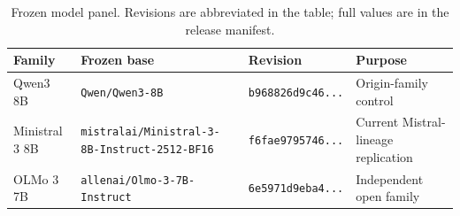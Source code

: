 \begin{table}[t]
\centering
\caption{Frozen model panel. Revisions are abbreviated in the table; full values are in the release manifest.}
\label{tab:model-panel}
\footnotesize
\begin{tabularx}{\textwidth}{@{}p{}p{}p{}X@{}}
\toprule
\textbf{Family} & \textbf{Frozen base} & \textbf{Revision} & \textbf{Purpose} \\
\midrule
Qwen3 8B & \texttt{Qwen/Qwen3-8B} & \texttt{b968826d9c46...} & Origin-family control \\
Ministral 3 8B & \texttt{mistralai/Ministral-3-8B-Instruct-2512-BF16} & \texttt{f6fae9795746...} & Current Mistral-lineage replication \\
OLMo 3 7B & \texttt{allenai/Olmo-3-7B-Instruct} & \texttt{6e5971d9eba4...} & Independent open family \\
\bottomrule
\end{tabularx}
\end{table}
